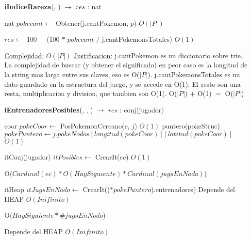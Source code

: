 \begin{Algoritmos}
\begin{algorithm}[H]
\begin{algorithmic}[1]
\end{algorithmic}
\end{algorithm}


\begin{algorithm}[H]
{\textbf{iIndiceRareza}(, ) $\to$ $res$ : nat}
\begin{algorithmic}[1]

\State nat $pokecant \gets$ Obtener(j.cantPokemon, $p$) \Comment $O(|P|)$

\State $res \gets$ 100 $-$ (100 $*$ $pokecant$ $/$ j.cantPokemonsTotales) \Comment $O(1)$

\medskip
\State \underline{Complejidad:} $O(|P|)$
\State \underline{Justificacion:} j.cantPokemon es un diccionario sobre trie. La complejidad de buscar (y obtener el significado) en peor caso es la longitud de la string mas larga entre sus claves, eso es O($|P|$). j.cantPokemonsTotales es un dato guardado en la estructura del juego, y se accede en O(1). El resto son una resta, multiplicacion y division, que tambien son O(1). O($|P|$) $+$ O(1) $=$ O($|P|$)

\end{algorithmic}
\end{algorithm}



\begin{algorithm}[H]
{\textbf{iEntrenadoresPosibles}(, , ) $\to$ $res$ : conj(jugador)}
\begin{algorithmic}[1]

\State coor $pokeCoor \gets$ PosPokemonCercano($c$, $j$) \Comment $O(1)$
\State puntero(pokeStruc) $pokePuntero \gets j.pokeNodos[longitud(pokeCoor)][latitud(pokeCoor)]$ \Comment $O(1)$

\State itConj(jugador) $itPosibles \gets$ CrearIt($ec$) \Comment $O(1)$

   \Comment O($Cardinal(ec) * O(HaySiguiente) * Cardinal(jugsEnNodo)$)
	
	\State itHeap $itJugsEnNodo \gets$ CrearIt(($*pokePuntero$).entrenadores)	  \Comment Depende del HEAP $O(Inifinito)$
	
	   \Comment O($HaySiguiente * \#jugsEnNodo$)

		   \Comment Depende del HEAP $O(Inifinito)$
		

\end{algorithmic}
\end{algorithm}
\end{Algoritmos}
